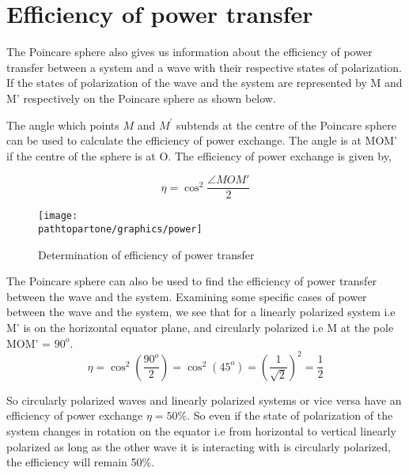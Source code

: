 \section{Efficiency of power transfer}
The Poincare sphere also gives us information about the efficiency of power transfer between a system and a wave with their respective states of polarization. If the states of polarization of the wave and the system are represented by M and M' respectively on the Poincare sphere as shown below.

The angle which points $M$ and $M^'$ subtends at the centre of the Poincare sphere can be used to calculate the efficiency of power exchange.
The angle is at MOM' if the centre of the sphere is at O. The efficiency of power exchange is given by,

\[\eta = \cos^2 {\frac{ \angle  MOM' }{2}}  \]
\begin{figure}
\centering
\texttt{[image: \\pathtopartone/graphics/power]}
\caption{Determination of efficiency of power transfer}
\label{fig:power}
\end{figure}

The Poincare sphere can also be used to find the efficiency of power transfer between the wave and the system. Examining some specific cases of power between the wave and the system, we see that for a linearly polarized system i.e M' is on the horizontal equator plane, and circularly polarized i.e M at the pole MOM' = $ 90^o $.
\[ \eta= \cos ^2(\frac{90^o}{2}) =\cos ^2(45^o) =(\frac{1}{\sqrt{2}})^2  = \frac{1}{2}\]

So circularly polarized waves and linearly polarized systems or vice versa have an efficiency of power exchange $ \eta=  50\% $. So even if the state of polarization of the system changes in rotation on the equator i.e from horizontal to vertical linearly polarized as long as the other wave it is interacting with is circularly polarized, the efficiency will remain 50\%.

